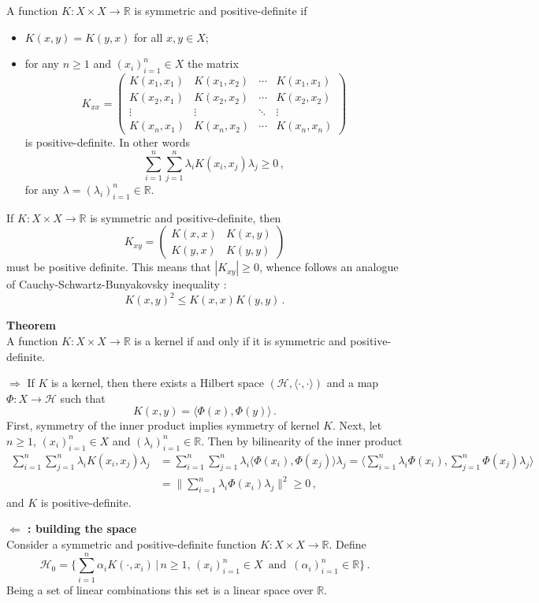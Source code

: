 \documentclass[a4paper]{article}
\newcommand{\Real}{\mathbb{R}}
\newcommand{\Hcal}{\mathcal{H}}
\begin{document}
A function $K : X\times X \to \Real$ is symmetric and positive-definite if \begin{itemize}
	\item $K(x,y) = K(y,x)$ for all $x,y\in X$;
	\item for any $n\geq1$ and $(x_i)_{i=1}^n\in X$ the matrix
	\[ K_{xx} = \begin{pmatrix}
			K(x_1,x_1) & K(x_1,x_2) & \cdots & K(x_1,x_1) \\
			K(x_2,x_1) & K(x_2,x_2) & \cdots & K(x_2,x_2) \\
			\vdots & \vdots & \ddots & \vdots \\
			K(x_n,x_1) & K(x_n,x_2) & \cdots & K(x_n,x_n)
		\end{pmatrix} \]
	is positive-definite. In other words
	\[ \sum_{i=1}^n \sum_{j=1}^n \lambda_i K(x_i,x_j)\lambda_j \geq 0\,, \]
	for any $\lambda = (\lambda_i)_{i=1}^n \in \Real$.
\end{itemize}
If $K : X\times X \to \Real$ is symmetric and positive-definite, then
\[ K_{xy} = \begin{pmatrix}
	K(x,x) & K(x,y)\\
	K(y,x) & K(y,y)
\end{pmatrix} \]
must be positive definite. This means that $|K_{xy}|\geq 0$, whence follows an
analogue of Cauchy-Schwartz-Bunyakovsky inequality :
\[ K(x,y)^2 \leq K(x,x) K(y,y)\,. \]

\noindent\textbf{Theorem}\hfill\\
A function $K : X\times X \to \Real$ is a kernel if and only if it is symmetric and
positive-definite.

\noindent\textbf{$\Rightarrow$} If $K$ is a kernel, then there exists a Hilbert space $(\Hcal, \langle\cdot,\cdot\rangle)$
and a map $\Phi:X\to \Hcal$ such that
\[ K(x,y) = \langle \Phi(x), \Phi(y)\rangle\,. \]
First, symmetry of the inner product implies symmetry of kernel $K$. Next, let 
$n\geq1$, $(x_i)_{i=1}^n\in X$ and $(\lambda_i)_{i=1}^n \in \Real$. Then by bilinearity
of the inner product
\begin{align*}
	\sum_{i=1}^n \sum_{j=1}^n \lambda_i K(x_i,x_j)\lambda_j
	&= \sum_{i=1}^n \sum_{j=1}^n \lambda_i \langle \Phi(x_i), \Phi(x_j)\rangle \lambda_j
	= \langle \sum_{i=1}^n \lambda_i \Phi(x_i), \sum_{j=1}^n \Phi(x_j) \lambda_j\rangle\\
	&= \| \sum_{i=1}^n \lambda_i \Phi(x_i) \lambda_j \|^2
	\geq 0\,,
\end{align*}
and $K$ is positive-definite.

\noindent \textbf{ $\Leftarrow$ : building the space}\hfill\\
Consider a symmetric and positive-definite function $K : X \times X \to \Real$.
Define
\[
\Hcal_0 = \bigl\{ \sum_{i=1}^n \alpha_i K(\cdot, x_i)\,\big|\,
n\geq 1,\, (x_i)_{i=1}^n\in X\, \text{ and }\, (\alpha_i)_{i=1}^n\in \Real \bigr\}\,.
\]
Being a set of linear combinations this set is a linear space over $\Real$.
\end{document}
